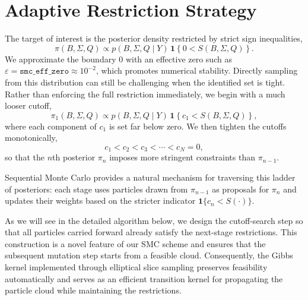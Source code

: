 \documentclass[11pt]{article}
\begin{document}
\section{Adaptive Restriction Strategy}
The target of interest is the posterior density restricted by strict sign inequalities,
\[
    \pi(B,\Sigma,Q) \propto p(B,\Sigma,Q \mid Y)\,\mathbf{1}\!\left\{0 < S(B,\Sigma,Q)\right\}.
\]
We approximate the boundary $0$ with an effective zero such as $\varepsilon = \texttt{smc\_eff\_zero} \approx 10^{-2}$, which promotes numerical stability. Directly sampling from this distribution can still be challenging when the identified set is tight. Rather than enforcing the full restriction immediately, we begin with a much looser cutoff,
\[
    \pi_1(B,\Sigma,Q) \propto p(B,\Sigma,Q \mid Y)\,\mathbf{1}\!\left\{c_1 < S(B,\Sigma,Q)\right\},
\]
where each component of $c_1$ is set far below zero. We then tighten the cutoffs monotonically,
\[
    c_1 < c_2 < c_3 < \cdots < c_N = 0,
\]
so that the $n$th posterior $\pi_n$ imposes more stringent constraints than $\pi_{n-1}$. 

Sequential Monte Carlo provides a natural mechanism for traversing this ladder of posteriors: each stage uses particles drawn from $\pi_{n-1}$ as proposals for $\pi_n$ and updates their weights based on the stricter indicator $\mathbf{1}\{c_n < S(\cdot)\}$. 

As we will see in the detailed algorithm below, we design the cutoff-search step so that all particles carried forward already satisfy the next-stage restrictions. This construction is a novel feature of our SMC scheme and ensures that the subsequent mutation step starts from a feasible cloud. Consequently, the Gibbs kernel implemented through elliptical slice sampling preserves feasibility automatically and serves as an efficient transition kernel for propagating the particle cloud while maintaining the restrictions.
\end{document}
